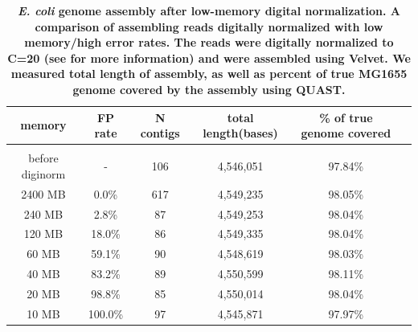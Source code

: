 \documentclass[10pt]{article}
\begin{document}
\begin{table}[!ht]
\caption{
\bf{{\em E. coli} genome assembly after low-memory digital normalization.
  A comparison of assembling reads digitally normalized with low memory/high
  error rates.  The reads were digitally normalized to 
  C=20 (see
  \cite{Brown2012} for more information) and were assembled using Velvet.
  We measured total length of assembly,
  as well as percent of true MG1655 genome covered by the assembly using QUAST.}}
\begin{tabular}{ | c | c | c | c | c | c |}
memory   & FP rate & N contigs & total length(bases) & \% of true genome covered \\
\hline \\
before diginorm  &-   & 106 & 4,546,051 & 97.84\% \\
    2400 MB  &  0.0\% & 617 & 4,549,235 & 98.05\% \\
     240 MB  &  2.8\% &  87 & 4,549,253 & 98.04\% \\
     120 MB  & 18.0\% &  86 & 4,549,335 & 98.04\% \\
      60 MB  & 59.1\% &  90 & 4,548,619 & 98.03\% \\
      40 MB  & 83.2\% &  89 & 4,550,599 & 98.11\% \\
      20 MB  & 98.8\% &  85 & 4,550,014 & 98.04\% \\
      10 MB  &100.0\% &  97 & 4,545,871 & 97.97\% \\
\end{tabular}
\begin{flushleft}
\end{flushleft}
\label{table:assembly}
\end{table}
\end{document}
